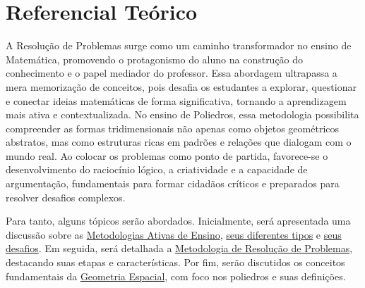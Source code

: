 

\chapter{Referencial Teórico} \label{cap:2_referencial}

A Resolução de Problemas surge como um caminho transformador no ensino de Matemática, promovendo o protagonismo do aluno na construção do conhecimento e o papel mediador do professor. Essa abordagem ultrapassa a mera memorização de conceitos, pois desafia os estudantes a explorar, questionar e conectar ideias matemáticas de forma significativa, tornando a aprendizagem mais ativa e contextualizada. No ensino de Poliedros, essa metodologia possibilita compreender as formas tridimensionais não apenas como objetos geométricos abstratos, mas como estruturas ricas em padrões e relações que dialogam com o mundo real. Ao colocar os problemas como ponto de partida, favorece-se o desenvolvimento do raciocínio lógico, a criatividade e a capacidade de argumentação, fundamentais para formar cidadãos críticos e preparados para resolver desafios complexos.

Para tanto, alguns tópicos serão abordados. Inicialmente, será apresentada uma discussão sobre as \hyperref[sec:2.1_MetAtiv]{Metodologias Ativas de Ensino}, \hyperref[sec:2.2_TiposMetAtiv]{seus diferentes tipos} e \hyperref[sec:2.3_DesafiosMetAtiv]{seus desafios}. Em seguida, será detalhada a \hyperref[sec:2.4_ResolucaoProblemas]{Metodologia de Resolução de Problemas}, destacando suas etapas e características. Por fim, serão discutidos os conceitos fundamentais da \hyperref[sec:2.5_Solidos Geometricos]{Geometria Espacial}, com foco nos poliedros e suas definições.



